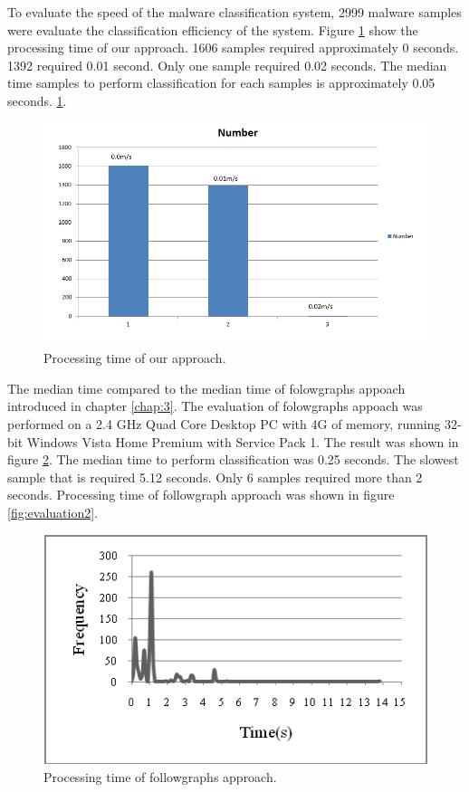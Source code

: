 To evaluate the speed of the malware classification system, 2999 malware samples were evaluate the classification efficiency of the system.
Figure \ref{fig:evaluation} show the processing time of our approach. 1606 samples required approximately 0 seconds. 1392  required 0.01 second. Only one sample required 0.02 seconds. The median time samples to perform classification for each samples is approximately 0.05 seconds.
\ref{fig:evaluation}.
\begin{figure}[h!]
\centering
\includegraphics[width=1\textwidth]
{graph/evaluation.png}
\caption{Processing time of our approach.}
\label{fig:evaluation}
\end{figure}
The median time compared to the median time of folowgraphs appoach introduced in chapter \ref{chap:3}. The evaluation of  folowgraphs appoach was performed on a 2.4 GHz Quad Core Desktop PC with 4G of memory, running 32-bit Windows Vista Home Premium with Service Pack 1\cite{silvio}. The result was shown in figure \ref{fig:evaluation1}. The median time to perform classification was 0.25 seconds. The slowest sample that is required 5.12 seconds. Only 6 samples required more than 2 seconds. Processing time of followgraph approach was shown in figure \ref{fig:evaluation2}.
\begin{figure}[h!]
\centering
\includegraphics[width=1\textwidth]
{graph/evaluation1.png}
\caption{Processing time of followgraphs approach.}
\label{fig:evaluation1}
\end{figure}

